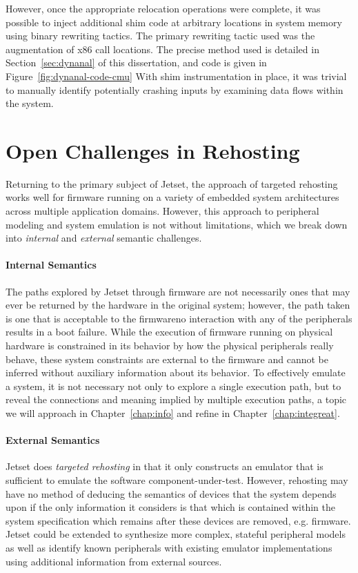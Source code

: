 However, once the appropriate relocation operations were complete, it was possible to inject additional shim code at arbitrary locations in system memory using binary rewriting tactics.
The primary rewriting tactic used was the augmentation of x86 call locations.
The precise method used is detailed in Section~\ref{sec:dynanal} of this dissertation, and code is given in Figure~\ref{fig:dynanal-code-cmu}
With shim instrumentation in place, it was trivial to manually identify potentially crashing inputs by examining data flows within the system.

\section{Open Challenges in Rehosting} 
\label{sec:jetset-limitations}

Returning to the primary subject of Jetset, the approach of targeted rehosting works well for firmware running on a variety of embedded system architectures across multiple application domains. 
However, this approach to peripheral modeling and system emulation is not without limitations, which we break down into \emph{internal} and \emph{external} semantic challenges.

\paragraph{Internal Semantics}
The paths explored by Jetset through firmware are not necessarily ones that may ever be returned by the hardware in the original system; however, the path taken is one that is acceptable to the firmware\textemdash no interaction with any of the peripherals results in a boot failure.
While the execution of firmware running on physical hardware is constrained in its behavior by how the physical peripherals really behave, these system constraints are external to the firmware and cannot be inferred without auxiliary information about its behavior.
To effectively emulate a system, it is not necessary not only to explore a single execution path, but to reveal the connections and meaning implied by multiple execution paths, a topic we will approach in Chapter~\ref{chap:info} and refine in Chapter~\ref{chap:integreat}.

\paragraph{External Semantics}
Jetset does \textit{targeted rehosting} in that it only constructs an emulator that is sufficient to emulate the software component-under-test.
However, rehosting may have no method of deducing the semantics of devices that the system depends upon if the only information it considers is that which is contained within the system specification which remains after these devices are removed, e.g. firmware.
Jetset could be extended to synthesize more complex, stateful peripheral models as well as identify known peripherals with existing emulator implementations using additional information from external sources.

